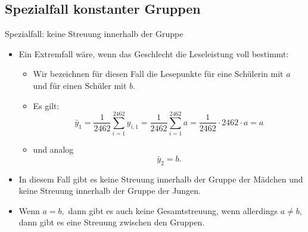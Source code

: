 \documentclass[usenames,dvipsnames,handout]{beamer}
\begin{document}
\subsection{Spezialfall konstanter Gruppen}
\begin{frame}{Spezialfall: keine Streuung innerhalb der Gruppe}
\begin{itemize}
\item{Ein Extremfall wäre, wenn das Geschlecht die Leseleistung voll bestimmt:\pause
\begin{itemize}
\item{Wir bezeichnen für diesen Fall die Lesepunkte für eine Schülerin mit $a$ und für
einen Schüler mit $b.$}\pause
\item{Es gilt: $$\bar{y}_{1}=\frac{1}{2462}\sum_{i=1}^{2462}y_{i,1} =  \frac{1}{2462}\sum_{i=1}^{2462}a= 
\frac{1}{2462} \cdot 2462 \cdot a =a$$ }
\item{und analog $$\bar{y}_{2} =b. $$}
\end{itemize}}\pause
\item{In diesem Fall gibt es keine Streuung innerhalb der Gruppe der Mädchen
und keine Streuung innerhalb der Gruppe der Jungen.}\pause
\item{Wenn $a=b,$ dann gibt es auch keine Gesamtstreuung, wenn allerdings $a \neq b,$
dann gibt es eine Streuung zwischen den Gruppen.}
\end{itemize}
\end{frame}
\end{document}
